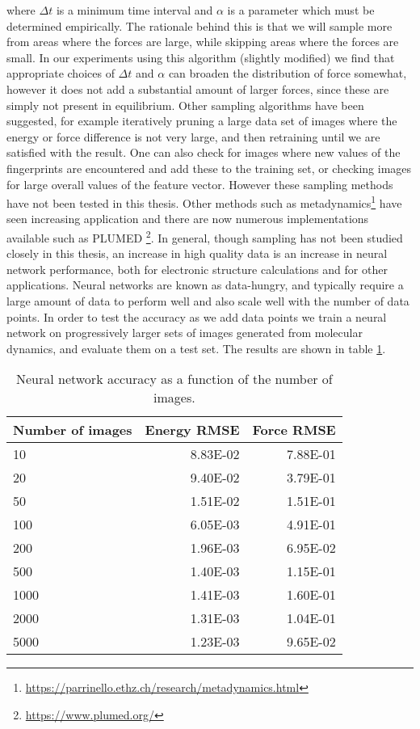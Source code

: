 where $\Delta t$ is a minimum time interval and $\alpha$ is a parameter
which must be determined empirically.
The rationale behind this is that we will sample more from
areas where the forces are large, while skipping areas
where the forces are small.
In our experiments using this algorithm (slightly modified)
we find that appropriate choices of $\Delta t$ and $\alpha$
can broaden the distribution of force somewhat, however
it does not add a substantial amount of larger forces, since
these are simply not present in equilibrium.
Other sampling algorithms have been suggested, for example iteratively
pruning a large data set of images where the energy or force 
difference is not very large, and then retraining until
we are satisfied with the result.
One can also check for images where new values of the fingerprints
are encountered and add these to the training set, or checking
images for large overall values of the feature vector. However
these sampling methods have not been tested in this thesis.
Other methods such as metadynamics\footnote{
\url{https://parrinello.ethz.ch/research/metadynamics.html}}
have seen increasing application and there are now numerous implementations
available such as PLUMED \footnote{\url{https://www.plumed.org/}}.
In general, though sampling has not been studied closely in this thesis,
an increase in high quality data is an increase in neural network
performance, both for electronic structure calculations
and for other applications.
Neural networks are known as data-hungry, and typically require
a large amount of data to perform well and also scale well
with the number of data points. In order to test the accuracy as we add data points
we train a neural network on progressively larger sets of images generated 
from molecular dynamics, and evaluate them on a test set.
The results are shown in table \ref{table:images}.

\begin{table}[H]
\centering
\begin{tabular}{lrr}
\toprule
Number of images &  Energy RMSE &  Force RMSE \\
\midrule
             10 &     8.83E-02 &    7.88E-01 \\
             20 &     9.40E-02 &    3.79E-01 \\
             50 &     1.51E-02 &    1.51E-01 \\
            100 &     6.05E-03 &    4.91E-01 \\
            200 &     1.96E-03 &    6.95E-02 \\
            500 &     1.40E-03 &    1.15E-01 \\
           1000 &     1.41E-03 &    1.60E-01 \\
           2000 &     1.31E-03 &    1.04E-01 \\
           5000 &     1.23E-03 &    9.65E-02 \\
\bottomrule
\end{tabular}
    \caption{Neural network accuracy as a function
        of the number of images.}
    \label{table:images}
\end{table}

